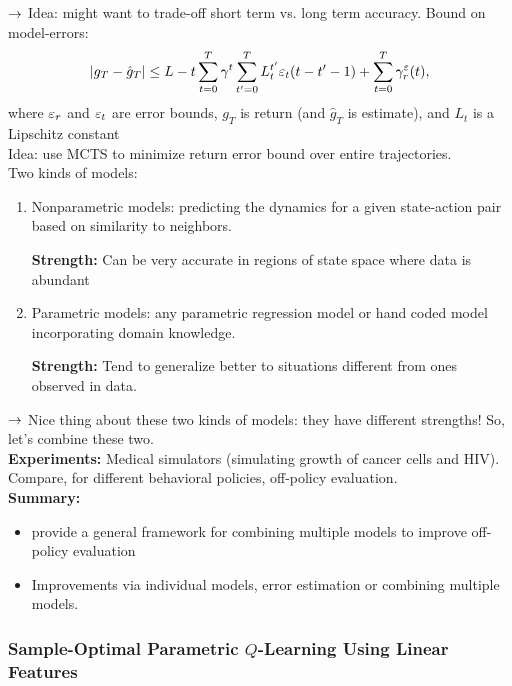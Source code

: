  $\rightarrow$ Idea: might want to trade-off short term vs. long term accuracy. Bound on model-errors:
 \[
 |g_T - \hat{g}_T| \leq L-t \sum_{t=0}^T \gamma^t \sum_{t'=0}^T L_t^{t'} \varepsilon_t (t-t'-1) + \sum_{t=0}^T \gamma^ \varepsilon_r(t),
 \]
where $\varepsilon_r$ and $\varepsilon_t$ are error bounds, $g_T$ is return (and $\hat{g}_T$ is estimate), and $L_t$ is a Lipschitz constant  \\

Idea: use MCTS to minimize return error bound over entire trajectories. \\

Two kinds of models:
\begin{enumerate}
    \item Nonparametric models: predicting the dynamics for a given state-action pair based on similarity to neighbors.
    
    {\bf Strength:}  Can be very accurate in regions of state space where data is abundant
    
    \item Parametric models: any parametric regression model or hand coded model incorporating domain knowledge.
    
    {\bf Strength:} Tend to generalize better to situations different from ones observed in data.
\end{enumerate}

$\rightarrow$ Nice thing about these two kinds of models: they have different strengths! So, let's combine these two.\\

{\bf Experiments:} Medical simulators (simulating growth of cancer cells and HIV). Compare, for different behavioral policies, off-policy evaluation. \\

{\bf Summary:}
\begin{itemize}
    \item provide a general framework for combining multiple models to improve off-policy evaluation
    \item Improvements via individual models, error estimation or combining multiple models.
\end{itemize}

\spacerule


\subsubsection{Sample-Optimal Parametric $Q$-Learning Using Linear Features~\cite{yang2019sample}}

